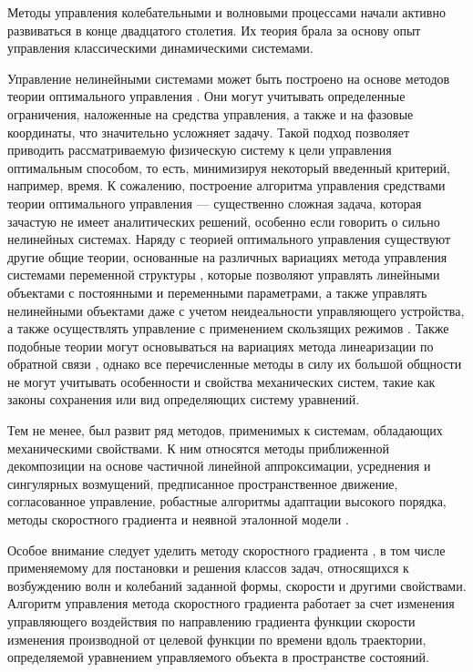 Методы управления колебательными и волновыми процессами начали активно развиваться в конце двадцатого столетия. Их теория брала за основу опыт управления классическими динамическими системами. 

Управление нелинейными системами может быть построено на основе методов теории оптимального управления \cite{intro_alekseev}. Они могут учитывать определенные ограничения, наложенные на средства управления, а также и на фазовые координаты, что значительно усложняет задачу. Такой подход позволяет приводить рассматриваемую физическую систему к цели управления оптимальным способом, то есть, минимизируя некоторый введенный критерий, например, время. К сожалению, построение алгоритма управления средствами теории оптимального управления --- существенно сложная задача, которая зачастую не имеет аналитических решений, особенно если говорить о сильно нелинейных системах.
Наряду с теорией оптимального управления существуют другие общие теории, основанные на различных вариациях метода управления системами переменной структуры \cite{intro_emel}, которые позволяют управлять линейными объектами с постоянными и переменными параметрами, а также управлять нелинейными объектами даже с учетом неидеальности управляющего устройства, а также осуществлять управление с применением скользящих режимов \cite{intro_utkin}. Также подобные теории могут основываться на вариациях метода линеаризации по обратной связи \cite{isidori1995nonlinear}, однако все перечисленные методы в силу их большой общности не могут учитывать особенности и свойства механических систем, такие как законы сохранения или вид определяющих систему уравнений.

Тем не менее, был развит ряд методов, применимых к системам, обладающих механическими свойствами. К ним относятся методы приближенной декомпозиции на основе частичной линейной аппроксимации, усреднения и сингулярных возмущений, предписанное пространственное движение, согласованное управление, робастные алгоритмы адаптации высокого порядка, методы скоростного градиента и неявной эталонной модели \cite{intro_miro}.

Особое внимание следует уделить методу скоростного градиента \cite{intro_andr}, в том числе применяемому для постановки и решения классов задач, относящихся к возбуждению волн и колебаний заданной формы, скорости и другими свойствами. Алгоритм управления метода скоростного градиента работает за счет изменения управляющего воздействия по направлению градиента функции скорости изменения производной от целевой функции по времени вдоль траектории, определяемой уравнением управляемого объекта в пространстве состояний. 

